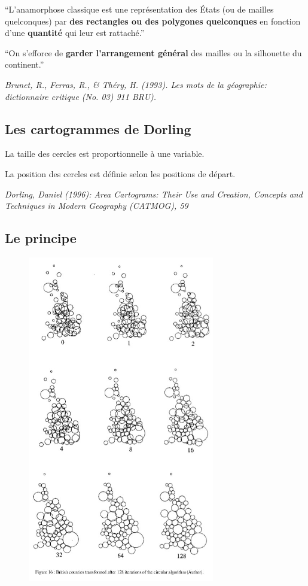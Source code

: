 \documentclass[]{book}
\begin{document}
``L'anamorphose classique est une représentation des États (ou de
mailles quelconques) par \textbf{des rectangles ou des polygones
quelconques} en fonction d'une \textbf{quantité} qui leur est
rattaché.''

``On s'efforce de \textbf{garder l'arrangement général} des mailles ou
la silhouette du continent.''

\emph{Brunet, R., Ferras, R., \& Théry, H. (1993). Les mots de la
géographie: dictionnaire critique (No. 03) 911 BRU).}

\subsection{Les cartogrammes de
Dorling}\label{les-cartogrammes-de-dorling}

La taille des cercles est proportionnelle à une variable.

La position des cercles est définie selon les positions de départ.

\emph{Dorling, Daniel (1996): Area Cartograms: Their Use and Creation,
Concepts and Techniques in Modern Geography (CATMOG), 59}

\subsection{Le principe}\label{le-principe}

\begin{figure}
\centering
\includegraphics{img/dorling1.png}
\caption{}
\end{figure}
\end{document}

